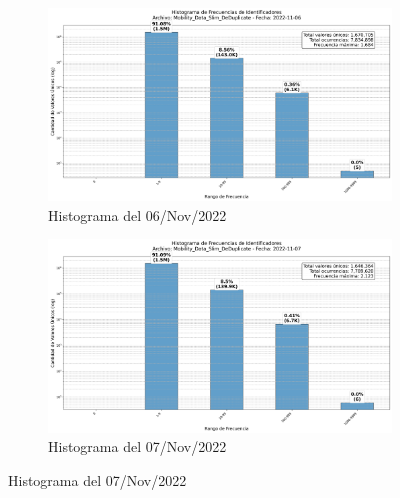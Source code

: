 \begin{figure}[htbp]
    \centering
    \begin{subfigure}[t]{0.48\textwidth-1em}
        \includegraphics[width=\linewidth]{img/daily_histograms/histograma_identifier_Mobility_Data_Slim_DeDuplicate_2022-11-06.png}
        \caption{Histograma del 06/Nov/2022}
        \label{fig:sub1}
    \end{subfigure}
    \hfill
    \begin{subfigure}[t]{0.48\textwidth-1em}
        \includegraphics[width=\linewidth]{img/daily_histograms/histograma_identifier_Mobility_Data_Slim_DeDuplicate_2022-11-07.png}
        \caption{Histograma del 07/Nov/2022}
        \label{fig:sub2}
    \end{subfigure}

    \vspace{0.5cm}


\end{figure}

